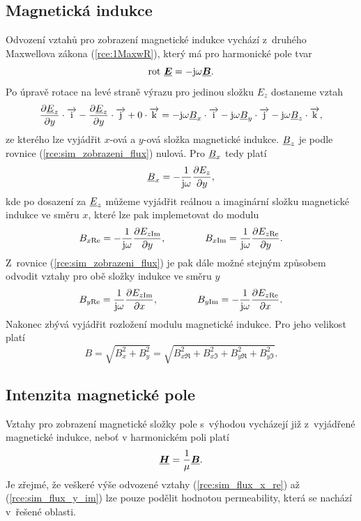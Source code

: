 \subsection*{Magnetická indukce}
Odvození vztahů pro zobrazení magnetické indukce vychází z~druhého Maxwellova zákona (\ref{rce:1MaxwR}), který má pro harmonické pole tvar
\begin{displaymath}
	\mathrm{rot}\ \mbox{\underline{\boldmath$E$}} = -\mathrm{j}\omega\mbox{\underline{\boldmath$B$}}.
\end{displaymath}
Po úpravě rotace na levé straně výrazu pro jedinou složku $E_z$ dostaneme vztah
\begin{equation}
	\frac{\partial {\underline{E}}_z}{\partial y}\cdot\overrightarrow{\mathrm{i}} - \frac{\partial {\underline{E}}_z}{\partial y}\cdot\overrightarrow{\mathrm{j}} + 0\cdot\overrightarrow{\mathrm{k}} = -\mathrm{j}\omega {\underline{B}}_x\cdot\overrightarrow{\mathrm{i}} - \mathrm{j}\omega{\underline{B}}_y\cdot\overrightarrow{\mathrm{j}} - \mathrm{j}\omega{\underline{B}}_z\cdot\overrightarrow{\mathrm{k}},
	\label{rce:sim_zobrazeni_flux}
\end{equation}
ze kterého lze vyjádřit $x$-ová a $y$-ová složka magnetické indukce. ${\underline{B}}_z$ je podle rovnice (\ref{rce:sim_zobrazeni_flux}) nulová. Pro ${\underline{B}}_x$ tedy platí
\begin{displaymath}
	{\underline{B}}_x = -\frac{1}{\mathrm{j}\omega}\frac{\partial E_z}{\partial y},
\end{displaymath}
kde po dosazení za ${\underline{E}}_z$ můžeme vyjádřit reálnou a imaginární složku magnetické indukce ve směru $x$, které lze pak implemetovat do modulu
\begin{equation}
	B_{x\mathrm{Re}} = -\frac{1}{\mathrm{j}\omega}\frac{\partial E_{z\mathrm{Im}}}{\partial y}, \qquad \qquad B_{x\mathrm{Im}} = \frac{1}{\mathrm{j}\omega}\frac{\partial E_{z\mathrm{Re}}}{\partial y}.
	\label{rce:sim_flux_x_re}
\end{equation}
Z~rovnice (\ref{rce:sim_zobrazeni_flux}) je pak dále možné stejným způsobem odvodit vztahy pro obě složky indukce ve směru $y$
\begin{equation}
	B_{y\mathrm{Re}} = \frac{1}{\mathrm{j}\omega}\frac{\partial E_{z\mathrm{Im}}}{\partial x}, \qquad \qquad B_{y\mathrm{Im}} = -\frac{1}{\mathrm{j}\omega}\frac{\partial E_{z\mathrm{Re}}}{\partial x}.
	\label{rce:sim_flux_y_im}
\end{equation}
Nakonec zbývá vyjádřit rozložení modulu magnetické indukce. Pro jeho velikost platí
\begin{displaymath}
	B = \sqrt{B_{x}^{2} + B_{y}^{2}} = \sqrt{B_{x\Re}^{2} + B_{x\Im}^{2} + B_{y\Re}^{2} + B_{y\Im}^{2}}.
\end{displaymath}

\subsection*{Intenzita magnetické pole}
Vztahy pro zobrazení magnetické složky pole s~výhodou vycházejí již z~vyjádřené magnetické indukce, neboť v harmonickém poli platí
\begin{displaymath}
\mbox{\underline{\boldmath$H$}} = \frac{1}{\mu} \mbox{\underline{\boldmath$B$}}.
\end{displaymath}
Je zřejmé, že veškeré výše odvozené vztahy (\ref{rce:sim_flux_x_re}) až (\ref{rce:sim_flux_y_im}) lze pouze podělit hodnotou permeability, která se nachází v~řešené oblasti. 

